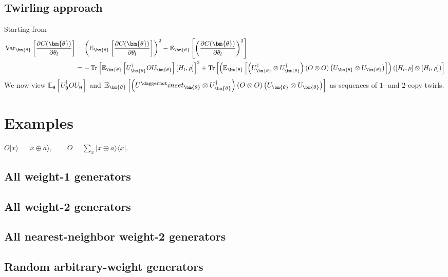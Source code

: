 \documentclass[a4paper,onecolumn,notitlepage,nofootinbib,longbibliography,superscriptaddress, floatfix, pra, aps, 10pt]{revtex4-2}
\newcommand{\vttheta}{{\bm{\theta}}}
\begin{document}
\subsection{Twirling approach}
Starting from \begin{align}
\text{Var}_\vttheta \left[\frac{\partial C(\vttheta)}{\partial {\theta_l}}\right] &= \left(\mathbb{E}_\vttheta \left[\frac{\partial C(\vttheta)}{\partial {\theta_l}}\right]\right)^2 - \mathbb{E}_\vttheta \left[\left(\frac{\partial C(\vttheta)}{\partial {\theta_l}}\right)^2\right] \\
&= -\Tr\left[\mathbb{E}_\vttheta \left[U_\vttheta^\dagger OU_\vttheta \right] \left[H_l,\rho\right]  \right]^2 + \Tr\left[\left(\mathbb{E}_\vttheta \left[\left(U^\dagger_\vttheta \otimes U^\dagger_\vttheta \right) \left(O \otimes O\right) \left(U_\vttheta \otimes U_\vttheta \right)\right]\right) \left(\left[H_l,\rho\right] \otimes \left[H_l,\rho\right] \right) \right] 
\end{align}
We now view $\mathbb{E}_\vttheta \left[U_\vttheta^\dagger OU_\vttheta \right]$ and $\mathbb{E}_\vttheta \left[\left(U^\daggernot in set_\vttheta \otimes U^\dagger_\vttheta \right) \left(O \otimes O\right) \left(U_\vttheta \otimes U_\vttheta \right)\right]$ as sequences of $1$- and $2$-copy twirls. 

\section{Examples}
$O\lvert x\rangle = \lvert x \oplus a\rangle, \qquad
O = \sum_x \lvert x \oplus a\rangle\langle x\rvert.$

\subsection{All weight-1 generators}
\subsection{All weight-2 generators}
\subsection{All nearest-neighbor weight-2 generators}
\subsection{Random arbitrary-weight generators}
\end{document}
